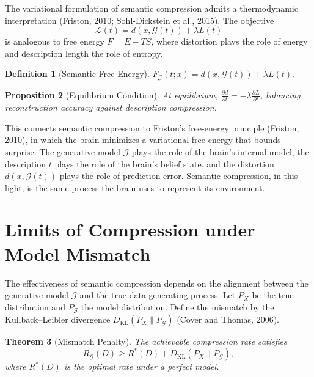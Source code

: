\documentclass[11pt,a4paper]{article}
\newtheorem{theorem}{Theorem}[section]
\newtheorem{proposition}[theorem]{Proposition}
\theoremstyle{definition}
\newtheorem{definition}[theorem]{Definition}
\theoremstyle{remark}
\begin{document}
The variational formulation of semantic compression admits a thermodynamic interpretation (Friston, 2010; Sohl-Dickstein et al., 2015). The objective
\[
\mathcal{L}(t) = d(x, \mathcal{G}(t)) + \lambda L(t)
\]
is analogous to free energy $F = E - TS$, where distortion plays the role of energy and description length the role of entropy.

\begin{definition}[Semantic Free Energy]
$F_{\mathcal{G}}(t; x) = d(x, \mathcal{G}(t)) + \lambda L(t)$.
\end{definition}

\begin{proposition}[Equilibrium Condition]
At equilibrium, $\frac{\partial d}{\partial t} = -\lambda \frac{\partial L}{\partial t}$, balancing reconstruction accuracy against description compression.
\end{proposition}

This connects semantic compression to Friston's free-energy principle (Friston, 2010), in which the brain minimizes a variational free energy that bounds surprise. The generative model $\mathcal{G}$ plays the role of the brain's internal model, the description $t$ plays the role of the brain's belief state, and the distortion $d(x, \mathcal{G}(t))$ plays the role of prediction error. Semantic compression, in this light, is the same process the brain uses to represent its environment.

\section{Limits of Compression under Model Mismatch}
\label{sec:mismatch}

The effectiveness of semantic compression depends on the alignment between the generative model $\mathcal{G}$ and the true data-generating process. Let $P_X$ be the true distribution and $P_{\mathcal{G}}$ the model distribution. Define the mismatch by the Kullback--Leibler divergence $D_{\mathrm{KL}}(P_X \| P_{\mathcal{G}})$ (Cover and Thomas, 2006).

\begin{theorem}[Mismatch Penalty]
The achievable compression rate satisfies
\[
R_{\mathcal{G}}(D) \ge R^*(D) + D_{\mathrm{KL}}(P_X \| P_{\mathcal{G}}),
\]
where $R^*(D)$ is the optimal rate under a perfect model.
\end{theorem}
\end{document}
